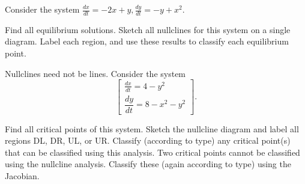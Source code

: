 \documentclass{ximera}
\begin{document}
\begin{exercise}
    Consider the system $\displaystyle \frac{dx}{dt}= -2x+y, \frac{dy}{dt}=-y+x^2$.
    \begin{tasks}
        \task Find all equilibrium solutions.
        \task Sketch all nullclines for this system on a single diagram. Label each region, and use these results to classify each equilibrium point.
    \end{tasks}
\end{exercise}

\begin{exercise} Nullclines need not be lines. Consider the system
    \[
        \begin{bmatrix} 
            \displaystyle \frac{dx}{dt}=4-y^2\\ 
            \dfrac{dy}{dt}=8-x^2-y^2 
        \end{bmatrix}.
    \]
    
    \begin{tasks}
        \task Find all critical points of this system.
        \task Sketch the nullcline diagram and label all regions DL, DR, UL, or UR. Classify (according to type) any critical point(s) that can be classified using this analysis.
        \task Two critical points cannot be classified using the nullcline analysis. Classify these (again according to type) using the Jacobian. 
    \end{tasks}
\end{exercise}
%
\end{document}
